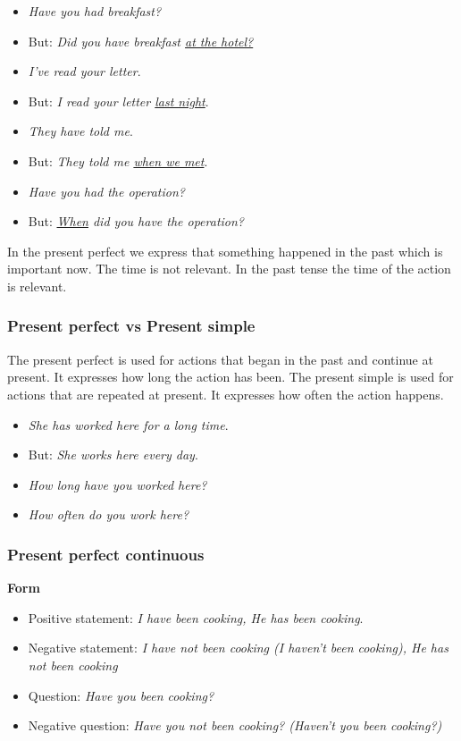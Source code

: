 \begin{itemize}

\item \textit{Have you had breakfast?}
\item But: \textit{Did you have breakfast \underline{at the hotel?}}
\item \textit{I've read your letter}.
\item But: \textit{I read your letter \underline{last night}}.
\item \textit{They have told me}.
\item But: \textit{They told me \underline{when we met}}.
\item \textit{Have you had the operation?}
\item But: \textit{\underline{When} did you have the operation?}

\end{itemize}

In the present perfect we express that something happened in the past which is important now. The time is not relevant. In the past tense the time of the action is relevant.

\subsubsection{Present perfect vs Present simple}

The present perfect is used for actions that began in the past and continue at present. It expresses how long the action has been. The present simple is used for actions that are repeated at present. It expresses how often the action happens.

\begin{itemize}

\item \textit{She has worked here for a long time}. 
\item But: \textit{She works here every day}.
\item \textit{How long have you worked here?}
\item \textit{How often do you work here?}

\end{itemize}

\subsubsection{Present perfect continuous}

\textbf{Form}

\begin{itemize}

\item Positive statement: \textit{I have been cooking, He has been cooking}.
\item Negative statement: \textit{I have not been cooking (I haven't been cooking), He has not been cooking}
\item Question: \textit{Have you been cooking?}
\item Negative question: \textit{Have you not been cooking? (Haven't you been cooking?)}
\end{itemize}

